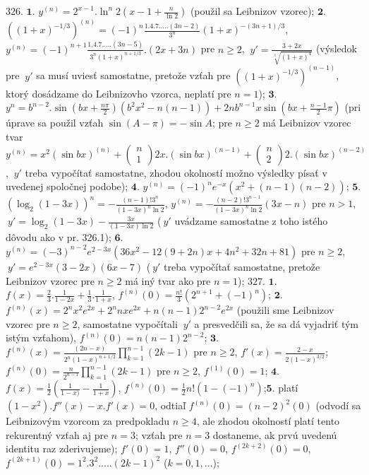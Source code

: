 $\boxed{326.}$ $\boldsymbol{1.}$ $y^{(n)}=2^{x-1}.\ln^{n}2 (x-1+\frac{n}{\ln 2}) $ (použil sa Leibnizov vzorec);
$\boldsymbol{2.}$ $((1+x)^{-1/3})^{(n)} =(-1)^{n}\frac {1.4.7.....(3n-2)}{3^{n}}(1+x)^{-(3n+1)/3}$,  $y^{(n)}=(-1)^{n+1}\frac{1.4.7.....(3n-5)}{3^{n}(1+x)^{n+1/3}}.(2x+3n)$ pre $n\geq 2$, $\ y'=\frac{3+2x}{\sqrt[3]{(1+x)^{4}}}$ (výsledok pre $\ y'$ sa musí uviesť samostatne, pretože vzťah pre $((1+x)^{-1/3})^{(n-1)}$, ktorý dosádzame do Leibnizovho vzorca, neplatí pre $n=1$);
$\boldsymbol{3.}$ $y^{n}=b^{n-2}.\sin (bx+\frac{n\pi}{2})(b^{2}x^{2}-n(n-1))+2nb^{n-1} x \sin (bx+\frac{n-1}{2}\pi )$ (pri úprave sa použil vzťah $\sin (A-\pi)=-\sin A$; pre $n\geq 2$ má Leibnizov vzorec tvar  $y^{(n)}=x^{2}(\sin bx)^{(n)}+ \begin{pmatrix}n \\1 \end{pmatrix} 2x.(\sin bx)^{(n-1)}+ \begin{pmatrix}n \\2 \end{pmatrix} 2.(\sin bx)^{(n-2)}$, $\ y'$ treba vypočítať samostatne, zhodou okolností možno výsledky písať v uvedenej spoločnej podobe);
$\boldsymbol{4.}$ $y^{(n)}=(-1)^{n}e^{-x}(x^{2}+(n-1)(n-2))$;
$\boldsymbol{5.}$ $(\log _{2}(1-3x))^{n}=-\frac{(n-1)!3^{n}}{(1-3x)^{n}\ln 2}$,  $y^{(n)}=-\frac{(n-2)!3^{n-1}}{(1-3x)^{n}\ln 2}(3x-n)$ pre $n>1$, $\ y'=\log _{2}(1-3x)-\frac{3x}{(1-3x)\ln 2}$ ($\ y'$ uvádzame samostatne z toho istého dôvodu ako v pr. 326.1); 
$\boldsymbol{6.}$ $y^{(n)}=(-3)^{n-2}e^{2-3x}(36x^{2}-12(9+2n)x+4n^{2}+32n+81)$ pre $n\geq 2$, $\ y'=e^{2-3x}(3-2x)(6x-7)$ ($\ y'$ treba vypočítať samostatne, pretože Leibnizov vzorec pre $n\geq 2$ má iný tvar ako pre $n=1$);
$\boxed{327.}$ $\boldsymbol{1.}$ $f(x)=\frac{2}{3}.\frac{1}{1-2x}+\frac{1}{3}.\frac{1}{1+x}$, $f^{(n)}(0)=\frac{n!}{3}(2^{n+1}+(-1)^{n})$;   
$\boldsymbol{2.}$ $f^{(n)}(x)=2^{n}x^{2}e^{2x}+2^{n}nxe^{2x}+n(n-1)2^{n-2}e^{2x}$ (použili sme Leibnizov vzorec pre $n\geq 2$, samostatne vypočítali $\ y'$ a presvedčili sa, že sa dá vyjadriť tým istým vzťahom), $f^{(n)}(0)=n(n-1)2^{n-2}$; 
$\boldsymbol{3.}$ $f^{(n)}(x)=\frac {(2n-x)}{2^{n}(1-x)^{n+1/2}}\prod_{k=1}^{n-1} (2k-1)$ pre $n\geq 2$, $ f'(x)=\frac{2-x}{2(1-x)^{3/2}}$; $f^{(n)}(0)=\frac{n}{2^{n-1}}\prod_{k=1}^{n-1} (2k-1)$ pre $n\geq 2$, $f^{(1)}(0)=1$;
$\boldsymbol{4.}$ $f(x)=\frac{1}{2}(\frac{1}{1-x)}-\frac{1}{1+x})$, $f^{(n)}(0)=\frac{1}{2}n!(1-(-1)^{n})$;$\boldsymbol{5.}$ platí $(1-x^{2}).f''(x)-x.f'(x)=0$, odtiaľ $f^{(n)}(0)=(n-2)^{2}(0)$ (odvodí sa Leibnizovým vzorcom za predpokladu $n\geq 4$, ale zhodou okolností platí tento rekurentný vzťah aj pre $n=3$; vzťah pre  $n=3$ dostaneme, ak prvú uvedenú identitu raz zderivujeme);  $f'(0)=1$, $f''(0)=0$, $f^{(2k+2)}(0)=0$, $f^{(2k+1)}(0)=1^{2}.3^{2}.....(2k-1)^{2}$  ($k=0,1,...$);
